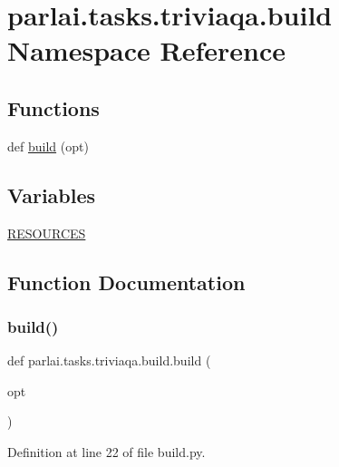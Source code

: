 \hypertarget{namespaceparlai_1_1tasks_1_1triviaqa_1_1build}{}\section{parlai.\+tasks.\+triviaqa.\+build Namespace Reference}
\label{namespaceparlai_1_1tasks_1_1triviaqa_1_1build}
\subsection*{Functions}
\begin{DoxyCompactItemize}
\item 
def \hyperlink{namespaceparlai_1_1tasks_1_1triviaqa_1_1build_a2e4e4e43e9c7bdb10a786035307d2227}{build} (opt)
\end{DoxyCompactItemize}
\subsection*{Variables}
\begin{DoxyCompactItemize}
\item 
\hyperlink{namespaceparlai_1_1tasks_1_1triviaqa_1_1build_ae7981e82f6d0b2f71930d438cda0cca9}{R\+E\+S\+O\+U\+R\+C\+ES}
\end{DoxyCompactItemize}


\subsection{Function Documentation}
\mbox{\label{namespaceparlai_1_1tasks_1_1triviaqa_1_1build_a2e4e4e43e9c7bdb10a786035307d2227}} 
\subsubsection{\texorpdfstring{build()}{build()}}
{\footnotesize\ttfamily def parlai.\+tasks.\+triviaqa.\+build.\+build (\begin{DoxyParamCaption}\item[{}]{opt }\end{DoxyParamCaption})}



Definition at line 22 of file build.\+py.


